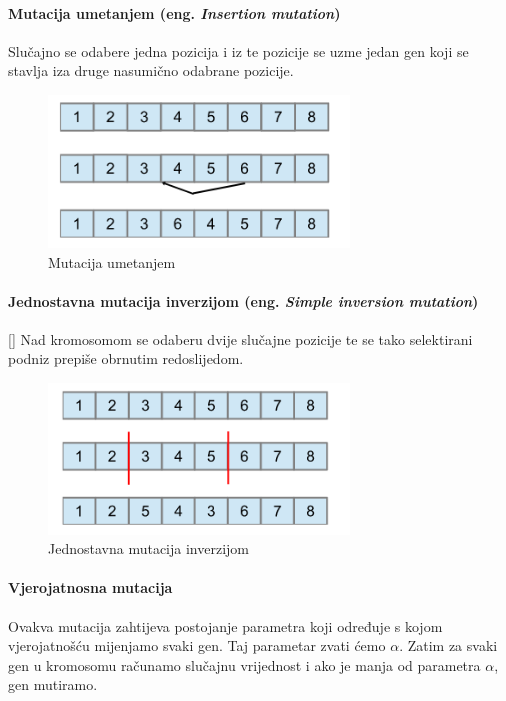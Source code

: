 \documentclass[times, utf8, zavrsni]{fer}
\begin{document}
\paragraph{Mutacija umetanjem (eng. \emph{Insertion mutation})}

Slučajno se odabere jedna pozicija i iz te pozicije se uzme jedan gen koji se stavlja iza druge nasumično odabrane pozicije. 


\begin{figure}[!htb]
	\centering
	\includegraphics[width=8cm]{slike/ISM.png}
	\caption{Mutacija umetanjem}
	\label{fig:insertion-mutation}
\end{figure}

\paragraph{Jednostavna mutacija inverzijom (eng. \emph{Simple inversion mutation})}[\citep{Holland}]
Nad kromosomom se odaberu dvije slučajne pozicije te se tako selektirani podniz prepiše obrnutim redoslijedom.


\begin{figure}[!htb]
	\centering
	\includegraphics[width=8cm]{slike/SIM.png}
	\caption{Jednostavna mutacija inverzijom}
	\label{fig:inversion-mutation}
\end{figure}

\paragraph{Vjerojatnosna mutacija}

Ovakva mutacija zahtijeva postojanje parametra koji određuje s kojom vjerojatnošću mijenjamo svaki gen. Taj parametar zvati ćemo \emph{$\alpha$}. Zatim za svaki gen u kromosomu računamo slučajnu vrijednost i ako je manja od parametra \emph{$\alpha$}, gen mutiramo. 
\end{document}
